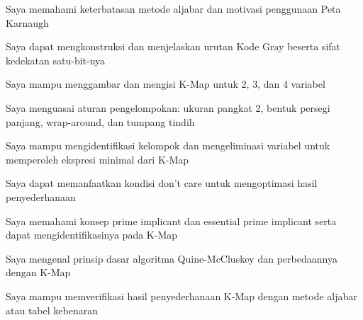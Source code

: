 \documentclass[../main]{subfiles}
\begin{document}
\begin{checklist}
  \item Saya memahami keterbatasan metode aljabar dan motivasi penggunaan Peta Karnaugh
  \item Saya dapat mengkonstruksi dan menjelaskan urutan Kode Gray beserta sifat kedekatan satu-bit-nya
  \item Saya mampu menggambar dan mengisi K-Map untuk 2, 3, dan 4 variabel
  \item Saya menguasai aturan pengelompokan: ukuran pangkat 2, bentuk persegi panjang, wrap-around, dan tumpang tindih
  \item Saya mampu mengidentifikasi kelompok dan mengeliminasi variabel untuk memperoleh ekspresi minimal dari K-Map
  \item Saya dapat memanfaatkan kondisi don't care untuk mengoptimasi hasil penyederhanaan
  \item Saya memahami konsep prime implicant dan essential prime implicant serta dapat mengidentifikasinya pada K-Map
  \item Saya mengenal prinsip dasar algoritma Quine-McCluskey dan perbedaannya dengan K-Map
  \item Saya mampu memverifikasi hasil penyederhanaan K-Map dengan metode aljabar atau tabel kebenaran
\end{checklist}

\end{document}
